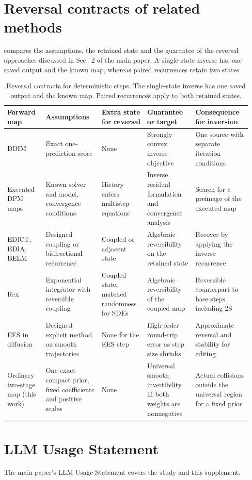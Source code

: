 \documentclass[10pt,twocolumn,letterpaper]{article}
\begin{document}
\FloatBarrier
\section{Reversal contracts of related methods}
\label{sec:contracts}
 compares the assumptions, the retained state and the guarantee of the reversal approaches discussed in Sec.~2 of the main paper. A single-state inverse has one saved output and the known map, whereas paired recurrences retain two states.

\begin{table}[t]
\centering\small
\setlength{\tabcolsep}{4pt}
\begin{tabular}{@{}Q{.175\textwidth}Q{.179\textwidth}Q{.143\textwidth}Q{.208\textwidth}Q{.222\textwidth}@{}}
\toprule
Forward map & Assumptions & Extra state for reversal & Guarantee or target & Consequence for inversion\\
\midrule
DDIM~\cite{verbii2026} & Exact one-prediction score & None & Strongly convex inverse objective & One source with separate iteration conditions\\
Executed DPM maps~\cite{hong2024} & Known solver and model, convergence conditions & History enters multistep equations & Inverse residual formulation and convergence analysis & Search for a preimage of the executed map\\
EDICT, BDIA, BELM~\cite{wallace2023,zhang2024,wang2024} & Designed coupling or bidirectional recurrence & Coupled or adjacent state & Algebraic reversibility on the retained state & Recover by applying the inverse recurrence\\
Rex~\cite{rex2026} & Exponential integrator with reversible coupling & Coupled state, matched randomness for SDEs & Algebraic reversibility of the coupled map & Reversible counterpart to base steps including 2S\\
EES in diffusion~\cite{barancikova2026} & Designed explicit method on smooth trajectories & None for the EES step & High-order round-trip error as step size shrinks & Approximate reversal and stability for editing\\
Ordinary two-stage map (this work) & One exact compact prior, fixed coefficients and positive scales & None & Universal smooth invertibility iff both weights are nonnegative & Actual collisions outside the universal region for a fixed prior\\
\bottomrule
\end{tabular}
\caption{Reversal contracts for deterministic steps. The single-state inverse has one saved output and the known map. Paired recurrences apply to both retained states.}
\label{tab:related}
\end{table}
\FloatBarrier
\section*{LLM Usage Statement}
The main paper's LLM Usage Statement covers the study and this supplement.
{\small}
\end{document}
